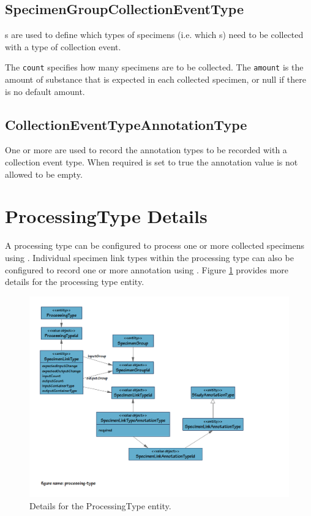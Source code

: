 \subsection*{SpecimenGroupCollectionEventType}

s are used to
define which types of specimens (i.e. which s) need
to be collected with a type of collection event.

The \texttt{count} specifies how many specimens are to be collected. The
\texttt{amount} is the amount of substance that is expected in each collected
specimen, or null if there is no default amount.

\subsection*{CollectionEventTypeAnnotationType}

One or more  are used to record
the annotation types to be recorded with a collection event type. When required
is set to true the annotation value is not allowed to be empty.

\section{ProcessingType Details}
\label{sec:processing-type}

A processing type can be configured to process one or more collected specimens
using . Individual specimen link types within the
processing type can also be configured to record one or more annotation using
. Figure \ref{fig:processing-type}
provides more details for the processing type entity.

\begin{figure}[H]
  \centering
  \includegraphics[trim={9mm 38mm 45mm 9mm}, clip,
    width=1\textwidth]{images/processing-type}
  \caption{Details for the ProcessingType entity.}
  \label{fig:processing-type}
\end{figure}

